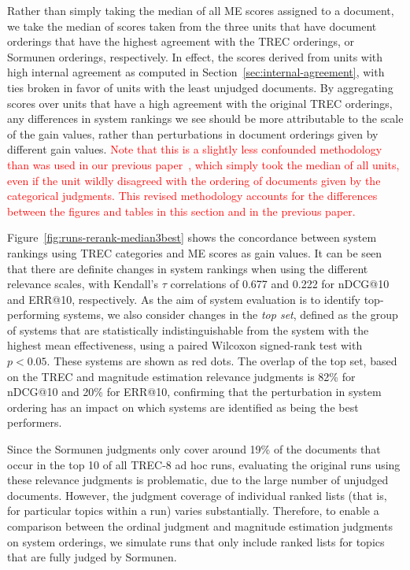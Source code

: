 Rather than simply taking the median of all ME scores assigned to a
document, we take the median of scores taken from the three units that
have document orderings that have the highest agreement with the TREC
orderings, or Sormunen orderings, respectively.
In effect, the scores derived from units with high internal agreement
as computed in Section~\ref{sec:internal-agreement}, with ties broken
in favor of units with the least unjudged documents.
By aggregating scores over units that have a high agreement with the
original TREC orderings, any differences in system rankings we see
should be more attributable to the scale of the gain values, rather
than perturbations in document orderings given by different gain
values.
\textcolor{red}{Note that this is a slightly less confounded methodology 
than was used in our previous paper~\cite{ME-SIGIR15}, which simply
took the median of all units, even if the unit wildly disagreed with
the ordering of documents given by the categorical judgments.
This revised methodology accounts for the differences between the
figures and tables in this section and in the previous paper.} 

Figure~\ref{fig:runs-rerank-median3best} shows the concordance between
system rankings using TREC categories and ME scores as gain values.
It can be seen that there are definite changes in system rankings when
using the different relevance scales, with Kendall's $\tau$
correlations of 0.677 and 0.222 for nDCG@10 and ERR@10, respectively.
As the aim of system evaluation is to identify top-performing systems,
we also consider changes in the \emph{top set}, defined as the group of
systems that are statistically indistinguishable from the system with
the highest mean effectiveness, using a paired Wilcoxon signed-rank
test with $p<0.05$.
These systems are shown as red dots.
The overlap of the top set, based on the TREC and magnitude estimation
relevance judgments is 82\% for nDCG@10 and 20\% for ERR@10, confirming
that the perturbation in system ordering has an impact on which systems
are identified as being the best performers.

Since the Sormunen judgments only cover around 19\% of the documents
that occur in the top 10 of all TREC-8 ad hoc runs, evaluating the
original runs using these relevance judgments is problematic, due to
the large number of unjudged documents.
However, the judgment coverage of individual ranked lists (that is,
for particular topics within a run) varies substantially.
Therefore, to enable a comparison between the ordinal judgment and
magnitude estimation judgments on system orderings, we simulate 
runs that only include ranked lists for topics that are fully judged by
Sormunen.

